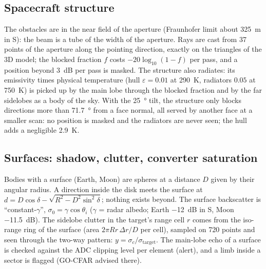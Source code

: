 \documentclass[11pt,a4paper]{article}
\begin{document}
\subsection{Spacecraft structure}
The obstacles are in the near field of the aperture (Fraunhofer limit about \SI{325}{m} in S): the beam is a tube of
the width of the aperture. Rays are cast from 37 points of the aperture along the pointing direction, exactly on the
triangles of the 3D model; the blocked fraction $f$ costs $-20\log_{10}(1-f)$ per pass, and a position beyond
\SI{3}{dB} per pass is masked. The structure also radiates: its emissivity times physical temperature (hull
$\varepsilon = 0.01$ at \SI{290}{K}, radiators $0.05$ at \SI{750}{K}) is picked up by the main lobe through the
blocked fraction and by the far sidelobes as a body of the sky. With the \SI{25}{\degree} tilt, the structure only
blocks directions more than \SI{71.7}{\degree} from a face normal, all served by another face at a smaller scan: no
position is masked and the radiators are never seen; the hull adds a negligible \SI{2.9}{K}.

\subsection{Surfaces: shadow, clutter, converter saturation}
Bodies with a surface (Earth, Moon) are spheres at a distance $D$ given by their angular radius. A direction inside the
disk meets the surface at $d = D\cos\delta - \sqrt{R^2 - D^2\sin^2\delta}$; nothing exists beyond. The surface
backscatter is ``constant-$\gamma$'', $\sigma_0 = \gamma\cos\theta_i$ ($\gamma$ = radar albedo; Earth \SI{-12}{dB} in
S, Moon \SI{-11.5}{dB}). The sidelobe clutter in the target's range cell $r$ comes from the iso-range ring of the
surface (area $2\pi R r\,\Delta r/D$ per cell), sampled on 720 points and seen through the two-way pattern:
$y = \sigma_c/\sigma_{\mathrm{target}}$. The main-lobe echo of a surface is checked against the ADC clipping level per
element (alert), and a limb inside a sector is flagged (GO-CFAR advised there).
\end{document}
